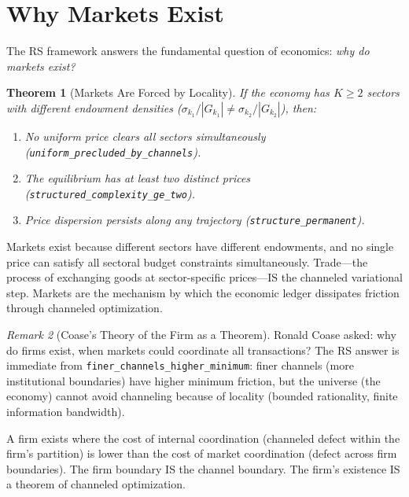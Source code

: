 \documentclass[11pt,a4paper]{article}
\theoremstyle{plain}
\newtheorem{theorem}{Theorem}[section]
\theoremstyle{definition}
\theoremstyle{remark}
\newtheorem{remark}[theorem]{Remark}
\begin{document}
\section{Why Markets Exist}\label{sec:markets}

The RS framework answers the fundamental question of economics: \emph{why do markets exist?}

\begin{theorem}[Markets Are Forced by Locality]
If the economy has $K \ge 2$ sectors with different endowment densities ($\sigma_{k_1}/|G_{k_1}| \ne \sigma_{k_2}/|G_{k_2}|$), then:
\begin{enumerate}[nosep,label=(\roman*)]
\item No uniform price clears all sectors simultaneously \emph{(\texttt{uniform\_precluded\_by\_channels})}.
\item The equilibrium has at least two distinct prices \emph{(\texttt{structured\_complexity\_ge\_two})}.
\item Price dispersion persists along any trajectory \emph{(\texttt{structure\_permanent})}.
\end{enumerate}
\end{theorem}

Markets exist because different sectors have different endowments, and no single price can satisfy all sectoral budget constraints simultaneously.
Trade---the process of exchanging goods at sector-specific prices---IS the channeled variational step.
Markets are the mechanism by which the economic ledger dissipates friction through channeled optimization.

\begin{remark}[Coase's Theory of the Firm as a Theorem]
Ronald Coase asked: why do firms exist, when markets could coordinate all transactions?
The RS answer is immediate from \texttt{finer\_channels\_higher\_minimum}: finer channels (more institutional boundaries) have higher minimum friction, but the universe (the economy) cannot avoid channeling because of locality (bounded rationality, finite information bandwidth).

A firm exists where the cost of internal coordination (channeled defect within the firm's partition) is lower than the cost of market coordination (defect across firm boundaries).
The firm boundary IS the channel boundary.
The firm's existence IS a theorem of channeled optimization.
\end{remark}
\end{document}
